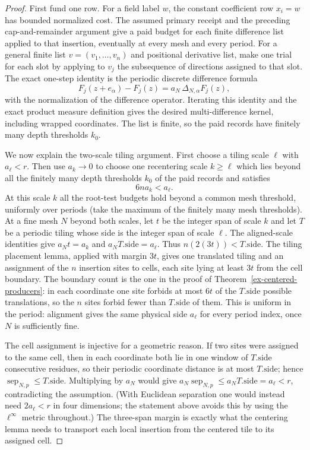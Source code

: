 \begin{proof}
First fund one row. For a field label $w$, the constant coefficient row
$x_i=w$ has bounded normalized cost. The assumed primary receipt and the
preceding cap-and-remainder argument give a paid budget for each finite
difference list applied to that insertion, eventually at every mesh and
every period.
For a general finite list $v=(v_1,\ldots,v_n)$ and positional derivative
list, make one trial for each slot by applying to $v_j$ the subsequence of
directions assigned to that slot. The exact one-step identity is the
periodic discrete difference formula
\[
 F_j(z+e_\alpha)-F_j(z)
   =a_N\,\Delta_{N,\alpha}F_j(z),
\]
with the normalization of the difference operator. Iterating this identity
and the exact product measure definition gives the desired multi-difference
kernel, including wrapped coordinates. The list is finite, so the paid
records have finitely many depth thresholds $k_0$.

We now explain the two-scale tiling argument. First choose a tiling scale
$\ell$ with $a_\ell<r$. Then use $a_k\to0$ to choose one recentering scale
$k\ge\ell$ which lies beyond all the finitely many depth thresholds $k_0$ of
the paid records and satisfies
\[
                         6n a_k<a_\ell .
\]
At this scale $k$ all the root-test budgets hold beyond a common mesh
threshold, uniformly over periods (take the maximum of the finitely many
mesh thresholds). At a fine mesh $N$ beyond both scales, let $t$ be the
integer span of scale $k$ and let $T$ be a periodic tiling whose side is the
integer span of scale $\ell$. The aligned-scale identities give
$a_Nt=a_k$ and $a_N T.\mathrm{side}=a_\ell$. Thus
$n(2(3t))<T.\mathrm{side}$. The tiling placement lemma, applied with margin
$3t$, gives one translated tiling and an assignment of the $n$ insertion
sites to cells, each site lying at least $3t$ from the cell boundary.
The boundary count is the one in the proof of
Theorem~\ref{ex-centered-producers}: in each coordinate one site forbids at
most $6t$ of the $T.\mathrm{side}$ possible translations, so the $n$ sites
forbid fewer than $T.\mathrm{side}$ of them.
This is uniform in the period: alignment gives the same physical side
$a_\ell$ for every period index, once $N$ is sufficiently fine.

The cell assignment is injective for a geometric reason. If two sites were
assigned to the same cell, then in each coordinate both lie in one window of
$T.\mathrm{side}$ consecutive residues, so their periodic coordinate
distance is at most $T.\mathrm{side}$; hence
$\operatorname{sep}_{N,p}\le T.\mathrm{side}$.
Multiplying by $a_N$ would give $a_N\operatorname{sep}_{N,p}\le
a_NT.\mathrm{side}=a_\ell<r$, contradicting the
assumption. (With Euclidean separation one would instead need
$2a_\ell<r$ in four dimensions; the statement above avoids this by using the
$\ell^\infty$ metric throughout.) The three-span margin is exactly what the centering lemma needs
to transport each local insertion from the centered tile to its assigned
cell.


\end{proof}
